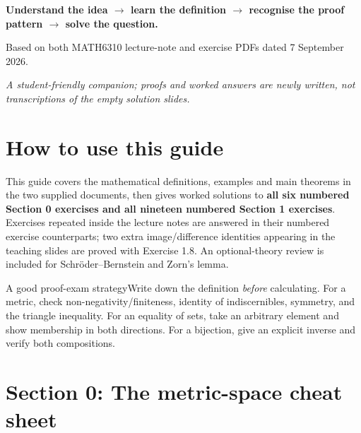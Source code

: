 \documentclass[11pt,a4paper]{article}
\begin{document}
\begin{titlepage}\centering\vspace*{25mm}{\Huge\bfseries Metric Spaces \& Topology\par}\vspace{5mm}{\LARGE MATH6310\par}\vspace{10mm}{\Large Combined master cheat sheet and fully worked exercise solutions\par}\vspace{7mm}{\large Sections 0 and 1: Metrics, sets, functions, equivalence relations, countability and orders\par}\vfill\begin{tcolorbox}[colback=sky,colframe=navy,width=.88\textwidth]\centering\large\textbf{Understand the idea $\to$ learn the definition $\to$ recognise the proof pattern $\to$ solve the question.}\end{tcolorbox}\vfill{\large Based on both MATH6310 lecture-note and exercise PDFs dated 7 September 2026.}\par\vspace{8mm}\textit{A student-friendly companion; proofs and worked answers are newly written, not transcriptions of the empty solution slides.}\end{titlepage}
\tableofcontents\newpage
\section{How to use this guide}
This guide covers the mathematical definitions, examples and main theorems in the two supplied documents, then gives worked solutions to \textbf{all six numbered Section 0 exercises and all nineteen numbered Section 1 exercises}. Exercises repeated inside the lecture notes are answered in their numbered exercise counterparts; two extra image/difference identities appearing in the teaching slides are proved with Exercise 1.8. An optional-theory review is included for Schr\"oder--Bernstein and Zorn's lemma.
\begin{tipbox}{A good proof-exam strategy}Write down the definition \emph{before} calculating. For a metric, check non-negativity/finiteness, identity of indiscernibles, symmetry, and the triangle inequality. For an equality of sets, take an arbitrary element and show membership in both directions. For a bijection, give an explicit inverse and verify both compositions.\end{tipbox}
\section{Section 0: The metric-space cheat sheet}
\end{document}
